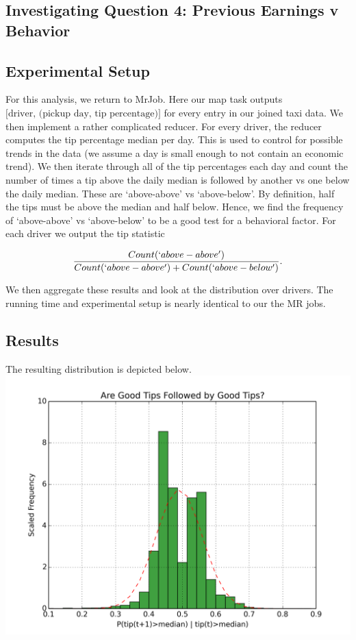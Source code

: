 \documentclass[twoside]{article}
\begin{document}
\begin{multicols}{2}
\section{Investigating Question 4: Previous Earnings v Behavior}
\subsection{Experimental Setup}
For this analysis, we return to MrJob. Here our map task outputs $\text{[driver, (pickup day, tip percentage)]}$
for every entry in our joined taxi data. We then implement a rather complicated reducer.  For every driver, the reducer computes the tip percentage median per day. This is used to control for possible trends in the data (we assume a day is small enough to not contain an economic trend). We then iterate through all of the tip percentages each day and count the number of times a tip above the daily median is followed by another vs one below the daily median. These are `above-above' vs `above-below'. By definition, half the tips must be above the median and half below. Hence, we find the frequency of `above-above' vs `above-below' to be a good test for a behavioral factor. For each driver we output the tip statistic

$$\frac{Count(`above-above')}{Count(`above-above') + Count(`above-below')}.$$

We then aggregate these results and look at the distribution over drivers. The running time and experimental setup is nearly identical to our the MR jobs. 
\subsection{Results}
The resulting distribution is depicted below. 
\includegraphics[scale=.35]{hothand.png}


\end{multicols}
\end{document}
